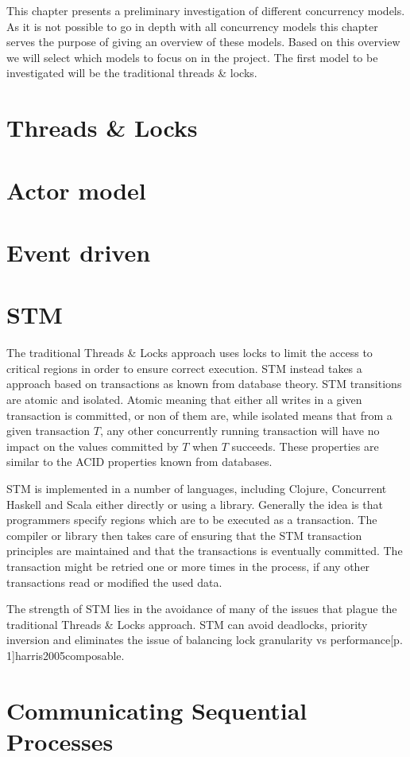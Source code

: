 \makeatletter {}\makeatother
{}
This chapter presents a preliminary investigation of different concurrency models. As it is not possible to go in depth with all concurrency models this chapter serves the purpose of giving an overview of these models. Based on this overview we will select which models to focus on in the project. The first model to be investigated will be the traditional threads \& locks.

\section{Threads \& Locks}
\section{Actor model}
\section{Event driven}
\section{\acl{STM}}
The traditional Threads \& Locks approach uses locks to limit the access to critical regions in order to ensure correct execution\cite[p. 1]{saha2006mcrt}. \ac{STM} instead takes a approach based on transactions as known from database theory\cite[p. 1]{shavit1997software}. \ac{STM} transitions are atomic and isolated. Atomic meaning that either all writes in a given transaction is committed, or non of them are, while isolated means that from a given transaction $T$, any other concurrently running transaction will have no impact on the values committed by $T$ when $T$ succeeds\cite[p. 102]{sevenModels}. These properties are similar to the ACID properties known from databases. 

\ac{STM} is implemented in a number of languages, including Clojure\cite[p. 101]{sevenModels}, Concurrent Haskell\cite{harris2005composable} and Scala\cite{goodman2011muts} either directly or using a library. Generally the idea is that programmers specify regions which are to be executed as a transaction. The compiler or library then takes care of ensuring that the \ac{STM} transaction principles are maintained and that the transactions is eventually committed\cite[p. 1]{saha2006mcrt}. The transaction might be retried one or more times in the process, if any other transactions read or modified the used data.

The strength of \ac{STM} lies in the avoidance of many of the issues that plague the traditional Threads \& Locks approach. \ac{STM} can avoid deadlocks, priority inversion and eliminates the issue of balancing lock granularity vs performance[p. 1]{harris2005composable}.
\section{Communicating Sequential Processes}

\worksheetend
